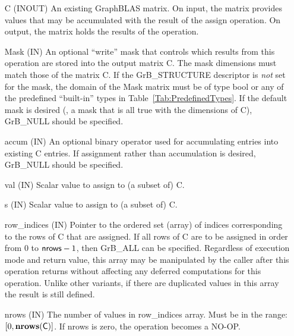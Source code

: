 \begin{itemize}[leftmargin=1.1in]
    \item[{\sf C}]    ({\sf INOUT}) An existing GraphBLAS matrix. On input,
    the matrix provides values that may be accumulated with the result of the
    assign operation.  On output, the matrix holds the results of the
    operation.

    \item[{\sf Mask}] ({\sf IN}) An optional ``write'' mask that controls which
    results from this operation are stored into the output matrix {\sf C}. The 
    mask dimensions must match those of the matrix {\sf C}. If the 
    {\sf GrB\_STRUCTURE} descriptor is {\em not} set for the mask, the domain of the 
    {\sf Mask} matrix must be of type {\sf bool} or any of the predefined 
    ``built-in'' types in Table~\ref{Tab:PredefinedTypes}.  If the default
    mask is desired (\ie, a mask that is all {\sf true} with the dimensions of {\sf C}), 
    {\sf GrB\_NULL} should be specified.

    \item[{\sf accum}] ({\sf IN}) An optional binary operator used for accumulating
    entries into existing {\sf C} entries.
    If assignment rather than accumulation is
    desired, {\sf GrB\_NULL} should be specified.

    \item[{\sf val}]    ({\sf IN}) Scalar value to assign to (a subset of) {\sf C}.
    
    \item[{\sf s}]    ({\sf IN}) Scalar value to assign to (a subset of) {\sf C}.

    \item[{\sf row\_indices}] ({\sf IN}) Pointer to the ordered set (array) of 
    indices corresponding to the rows of {\sf C} that are assigned.  If all rows
    of {\sf C} are to be assigned in order from $0$ to ${\sf nrows} - 1$, then 
    {\sf GrB\_ALL} can be specified.  Regardless of execution mode and return 
    value, this array may be manipulated by the caller after this operation 
    returns without affecting any deferred computations for this operation.  
    Unlike other variants, if there are duplicated values in this array the 
    result is still defined.

    \item[{\sf nrows}] ({\sf IN}) The number of values in {\sf row\_indices}
    array. Must be in the range: $[0, \bold{nrows}({\sf C})]$.  If
    {\sf nrows} is zero, the operation becomes a NO-OP.


\end{itemize}
